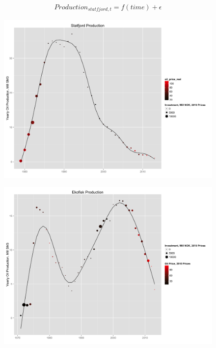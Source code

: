 \documentclass{beamer}
\begin{document}
\begin{frame}[plain]
	\begin{multline}
	\nonumber Production_{statfjord,t}=f(time) + \epsilon
	\end{multline}
\end{frame}


\begin{frame}[plain]
	\begin{figure}
	\includegraphics[width=1\textwidth]{statfjord_gam.png}
	\end{figure}
\end{frame}

\begin{frame}[plain]
	\begin{figure}
	\includegraphics[width=1\textwidth]{ekofisk_plot.png}
	\end{figure}
\end{frame}
\end{document}
